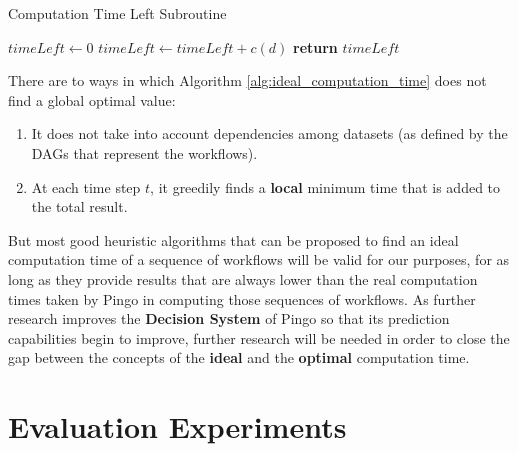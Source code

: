 \begin{algorithm}
\begin{singlespace}
\caption{Computation Time Left Subroutine}
\label{alg:computation_time_left}
\begin{algorithmic}[1]
	\State $timeLeft \gets 0$
			\State $timeLeft \gets timeLeft + c(d)$
		\EndIf
	\EndFor
	\State \textbf{return} $timeLeft$
\EndProcedure
\end{algorithmic}
\end{singlespace}
\end{algorithm}

There are to ways in which Algorithm \ref{alg:ideal_computation_time} does not find a global optimal value:
\begin{enumerate}
\item It does not take into account dependencies among datasets (as defined by the DAGs that represent the workflows).
\item At each time step $t$, it greedily finds a \textbf{local} minimum time that is added to the total result.
\end{enumerate}

But most good heuristic algorithms that can be proposed to find an ideal computation time of a sequence of workflows will be valid for our purposes, for as long as they provide results that are always lower than the real computation times taken by Pingo in computing those sequences of workflows.  As further research improves the \textbf{Decision System} of Pingo so that its prediction capabilities begin to improve, further research will be needed in order to close the gap between the concepts of the \textbf{ideal} and the \textbf{optimal} computation time.
\section{Evaluation Experiments}